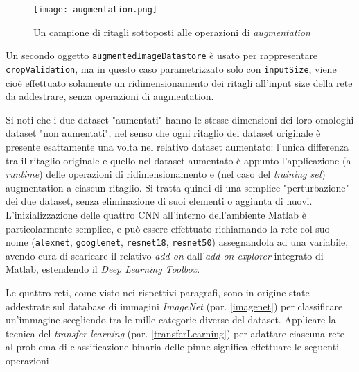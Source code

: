 \begin{figure}[h!]
  \centering
  \texttt{[image: augmentation.png]}
  \caption{Un campione di ritagli sottoposti alle operazioni di \textit{augmentation}}
  \label{fig:augmentation}
\end{figure}

Un secondo oggetto \verb|augmentedImageDatastore| è usato per rappresentare \verb|cropValidation|, ma in questo caso parametrizzato solo con \verb|inputSize|, viene cioè effettuato solamente un ridimensionamento dei ritagli all'input size della rete da addestrare, senza operazioni di augmentation.

Si noti che i due dataset "aumentati" hanno le stesse dimensioni dei loro omologhi dataset "non aumentati", nel senso che ogni ritaglio del dataset originale è presente esattamente una volta nel relativo dataset aumentato: l'unica differenza tra il ritaglio originale e quello nel dataset aumentato è appunto l'applicazione (a \textit{runtime}) delle operazioni di ridimensionamento e (nel caso del \textit{training set}) augmentation a ciascun ritaglio. Si tratta quindi di una semplice "perturbazione" dei due dataset, senza eliminazione di suoi elementi o aggiunta di nuovi.\\

L'inizializzazione delle quattro CNN all'interno dell'ambiente Matlab è particolarmente semplice, e può essere effettuato richiamando la rete col suo nome (\verb|alexnet|, \verb|googlenet|, \verb|resnet18|, \verb|resnet50|) assegnandola ad una variabile, avendo cura di scaricare il relativo \textit{add-on} dall'\textit{add-on explorer} integrato di Matlab, estendendo il \textit{Deep Learning Toolbox}.

Le quattro reti, come visto nei rispettivi paragrafi, sono in origine state addestrate sul database di immagini \textit{ImageNet} (par. \ref{imagenet}) per classificare un'immagine scegliendo tra le mille categorie diverse del dataset. Applicare la tecnica del \textit{transfer learning} (par. \ref{transferLearning}) per adattare ciascuna rete al problema di classificazione binaria delle pinne significa effettuare le seguenti operazioni


